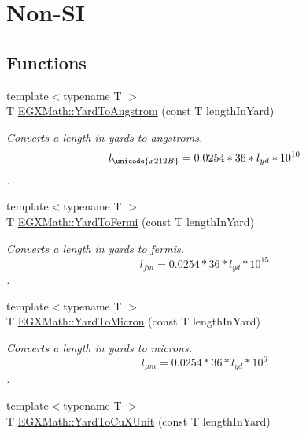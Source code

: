 \hypertarget{group___e_g_x_math-_conversions-_length_conversions-_imperial-_yard-_non-_s_i}{}\section{Non-\/\+SI}
\label{group___e_g_x_math-_conversions-_length_conversions-_imperial-_yard-_non-_s_i}
\subsection*{Functions}
\begin{DoxyCompactItemize}
\item 
{\footnotesize template$<$typename T $>$ }\\T \mbox{\hyperlink{group___e_g_x_math-_conversions-_length_conversions-_imperial-_yard-_non-_s_i_gaacff083bdc6b954da2e4b63f857cb429}{E\+G\+X\+Math\+::\+Yard\+To\+Angstrom}} (const T length\+In\+Yard)
\begin{DoxyCompactList}\small\item\em Converts a length in yards to angstroms. \[ l_{\unicode{x212B}}=0.0254 * 36 * l_{yd} * 10^{10} \]. \end{DoxyCompactList}\item 
{\footnotesize template$<$typename T $>$ }\\T \mbox{\hyperlink{group___e_g_x_math-_conversions-_length_conversions-_imperial-_yard-_non-_s_i_ga796a8607338fefb728574de07375543f}{E\+G\+X\+Math\+::\+Yard\+To\+Fermi}} (const T length\+In\+Yard)
\begin{DoxyCompactList}\small\item\em Converts a length in yards to fermis. \[ l_{fm}=0.0254 * 36 * l_{yd} * 10^{15} \]. \end{DoxyCompactList}\item 
{\footnotesize template$<$typename T $>$ }\\T \mbox{\hyperlink{group___e_g_x_math-_conversions-_length_conversions-_imperial-_yard-_non-_s_i_ga7d167f52b344853fd58dcc589e0ad301}{E\+G\+X\+Math\+::\+Yard\+To\+Micron}} (const T length\+In\+Yard)
\begin{DoxyCompactList}\small\item\em Converts a length in yards to microns. \[ l_{\mu m}=0.0254 * 36 * l_{yd} * 10^{6} \]. \end{DoxyCompactList}\item 
{\footnotesize template$<$typename T $>$ }\\T \mbox{\hyperlink{group___e_g_x_math-_conversions-_length_conversions-_imperial-_yard-_non-_s_i_gabf4916569d4002f5c0ec8bbef8207980}{E\+G\+X\+Math\+::\+Yard\+To\+Cu\+X\+Unit}} (const T length\+In\+Yard)

\end{DoxyCompactItemize}
